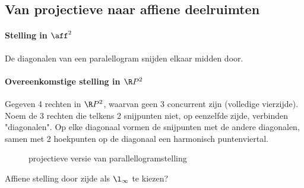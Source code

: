 \subsection{Van projectieve naar affiene deelruimten} \label{sec:van_projectieve_naar_affiene_deelruimten}

	\paragraph{Stelling in $\aff^2$}
	De diagonalen van een paralellogram snijden elkaar midden door.

	\paragraph{Overeenkomstige stelling in $\R P^2$}
	Gegeven 4 rechten in $\R P^2$, waarvan geen 3 concurrent zijn (volledige vierzijde).
	Noem de 3 rechten die telkens 2 snijpunten niet, op eenzelfde zijde, verbinden "diagonalen". Op elke diagonaal vormen de snijpunten met de andere diagonalen, samen met 2 hoekpunten op de diagonaal een harmonisch puntenviertal.
\begin{figure}[ht]
    \centering
    \caption{projectieve versie van parallellogramstelling}
    \label{fig:projectieve-versie-van-parallellogramstelling}
\end{figure}
\begin{oef}
	Affiene stelling door zijde als $\l_\infty$ te kiezen?	
\end{oef}
